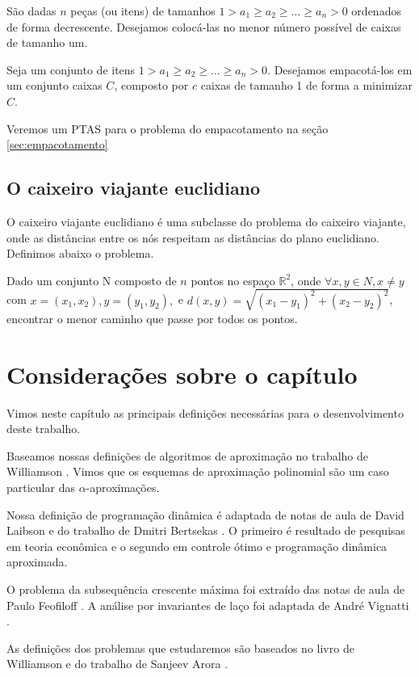 São dadas $n$ peças (ou itens) de tamanhos $1 > a_1 \geq a_2 \geq \ldots \geq a_n > 0 $ ordenados de forma decrescente. Desejamos colocá-las no menor número possível de caixas de tamanho um.

\begin{definition}
Seja um conjunto de itens $1 > a_1 \geq a_2 \geq \ldots \geq a_n > 0 $. Desejamos empacotá-los em um conjunto caixas $C$, composto por $c$ caixas de tamanho 1 de forma a minimizar $C$.
\end{definition}

Veremos um PTAS para o problema do empacotamento na seção \ref{sec:empacotamento}

\subsection{O caixeiro viajante euclidiano}

O caixeiro viajante euclidiano é uma subclasse do problema do caixeiro viajante, onde as distâncias entre os nós respeitam as distâncias do plano euclidiano. Definimos abaixo o problema.

\begin{definition}
Dado um conjunto N composto de $n$ pontos no espaço $\mathbb{R}^2$, onde $\forall x,y \in N, x \neq y$ com $x=(x_1,x_2),y=(y_1,y_2), $ e $d(x,y) = \sqrt{ (x_1 - y_1)^2 + (x_2 - y_2)^2}$, encontrar o menor caminho que passe por todos os pontos.
\end{definition}

\section{Considerações sobre o capítulo}

Vimos neste capítulo as principais definições necessárias para o desenvolvimento deste trabalho.

Baseamos nossas definições de algoritmos de aproximação no trabalho de Williamson \cite{Williamson}. Vimos que os esquemas de aproximação polinomial são um caso particular das $\alpha$-aproximações.

Nossa definição de programação dinâmica é adaptada de notas de aula de David Laibson \cite{laibson} e do trabalho de Dmitri Bertsekas \cite{Bertsekas}. O primeiro é resultado de pesquisas em teoria econômica e o segundo em controle ótimo e programação dinâmica aproximada.

O problema da subsequência crescente máxima foi extraído das notas de aula de Paulo Feofiloff \cite{feofiloff}. A análise por invariantes de laço foi adaptada de André Vignatti \cite{vignattiaulas}.

As definições dos problemas que estudaremos são baseados no livro de Williamson \cite{Williamson} e do trabalho de Sanjeev Arora \cite{Arora}.
